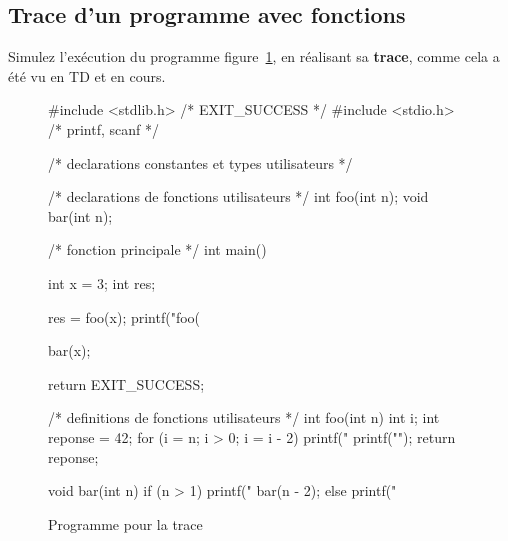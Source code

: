 \subsection{Trace d'un programme avec fonctions}

\question Simulez l'exécution du programme figure~\ref{fig:prog}, en réalisant sa
\textbf{trace}, comme cela a été vu en TD et en cours. 

\begin{figure}[htbp]
  \centering
\begin{small}
\begin{listing}{1}
#include <stdlib.h> /* EXIT_SUCCESS */
#include <stdio.h> /* printf, scanf */

/* declarations constantes et types utilisateurs */

/* declarations de fonctions utilisateurs */
int foo(int n);
void bar(int n);

/* fonction principale */
int main()
{
    int x = 3;
    int res;

    res = foo(x);
    printf("foo(%
    
    bar(x);

    return EXIT_SUCCESS;
}

/* definitions de fonctions utilisateurs */
int foo(int n)
{
    int i;
    int reponse = 42;
    for (i = n; i > 0; i = i - 2)
    {
        printf("%
    }
    printf("\n");
    return reponse;
}

void bar(int n)
{
    if (n > 1) 
    {
        printf("%
        bar(n - 2);
    }
    else
    {
        printf("%
    }
}
\end{listing}
\end{small} 
  \caption{Programme pour la trace}
  \label{fig:prog}
\end{figure}


